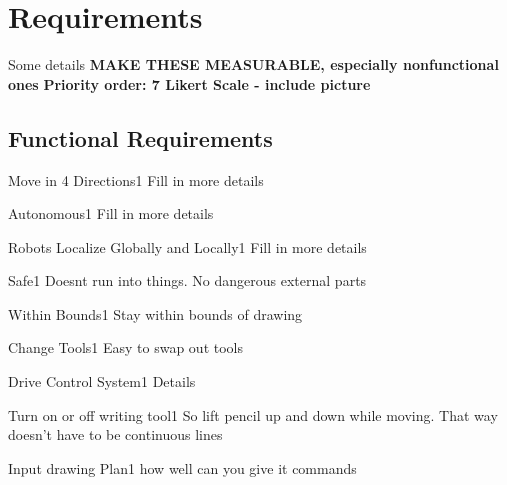 
\section{Requirements}
\label{sec:requirements}
Some details
\textbf{MAKE THESE MEASURABLE, especially nonfunctional ones}
\textbf{Priority order: 7 Likert Scale - include picture}

\subsection{Functional Requirements}

\begin{functional_requirement}{Move in 4 Directions}{1}
Fill in more details 
\end{functional_requirement}

\begin{functional_requirement}{Autonomous}{1}
Fill in more details 
\end{functional_requirement}

\begin{functional_requirement}{Robots Localize Globally and Locally}{1}
Fill in more details 
\end{functional_requirement}

\begin{functional_requirement}{Safe}{1}
Doesnt run into things. No dangerous external parts
\end{functional_requirement}

\begin{functional_requirement}{Within Bounds}{1}
Stay within bounds of drawing
\end{functional_requirement}

\begin{functional_requirement}{Change Tools}{1}
Easy to swap out tools
\end{functional_requirement}

\begin{functional_requirement}{Drive Control System}{1}
Details
\end{functional_requirement}

\begin{functional_requirement}{Turn on or off writing tool}{1}
So lift pencil up and down while moving. That way doesn't have to be continuous lines
\end{functional_requirement}

\begin{functional_requirement}{Input drawing Plan}{1}
how well can you give it commands
\end{functional_requirement}

